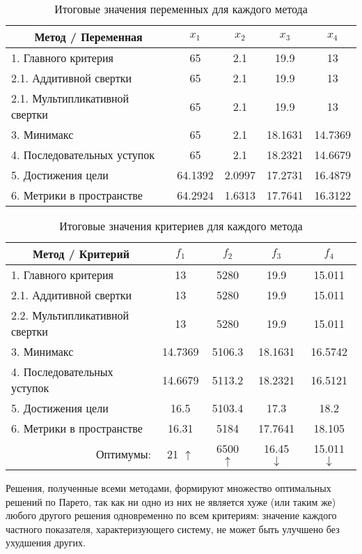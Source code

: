 \begin{table}[H]
	\centering
	\caption{Итоговые значения переменных для каждого метода}
	\begin{tabular}{|l|c|c|c|c|}
		\hline
		\multicolumn{1}{|c|}{\textbf{Метод / Переменная}} & $x_1$   & $x_2$  & $x_3$   & $x_4$   \\ \hline
		1. Главного критерия          & 65      & 2.1    & 19.9    & 13      \\ \hline
		2.1. Аддитивной свертки       & 65      & 2.1    & 19.9    & 13      \\ \hline
		2.1. Мультипликативной свертки& 65      & 2.1    & 19.9    & 13      \\ \hline
		3. Минимакс                   & 65      & 2.1    & 18.1631 & 14.7369 \\ \hline
		4. Последовательных уступок   & 65      & 2.1    & 18.2321 & 14.6679 \\ \hline
		5. Достижения цели            & 64.1392 & 2.0997 & 17.2731 & 16.4879 \\ \hline
		6. Метрики в пространстве     & 64.2924 & 1.6313 & 17.7641 & 16.3122 \\ \hline
	\end{tabular}
\end{table}

\begin{table}[H]
	\centering
	\caption{Итоговые значения критериев для каждого метода}
	\begin{tabular}{|l|c|c|c|c|}
		\hline
		\multicolumn{1}{|c|}{\textbf{Метод / Критерий}} & $f_1$   & $f_2$  & $f_3$   & $f_4$   \\ \hline
		1. Главного критерия                 & 13      & 5280   & 19.9    & 15.011  \\ \hline
		2.1. Аддитивной свертки              & 13      & 5280   & 19.9    & 15.011  \\ \hline
		2.2. Мультипликативной свертки       & 13      & 5280   & 19.9    & 15.011  \\ \hline
		3. Минимакс                          & 14.7369 & 5106.3 & 18.1631 & 16.5742 \\ \hline
		4. Последовательных уступок          & 14.6679 & 5113.2 & 18.2321 & 16.5121 \\ \hline
		5. Достижения цели                   & 16.5    & 5103.4 & 17.3    & 18.2    \\ \hline
		6. Метрики в пространстве            & 16.31   & 5184   & 17.7641 & 18.105  \\ \hline
		\multicolumn{1}{|r|}{Оптимумы:}      & 21 $\uparrow$ & 6500 $\uparrow$ & 16.45 $\downarrow$ & 15.011 $\downarrow$ \\ \hline
	\end{tabular}
\end{table}

Решения, полученные всеми методами, формируют множество оптимальных решений по Парето, так как ни одно из них не является хуже (или таким же) любого другого решения одновременно по всем критериям: значение каждого частного показателя, характеризующего систему, не может быть улучшено без ухудшения других.



